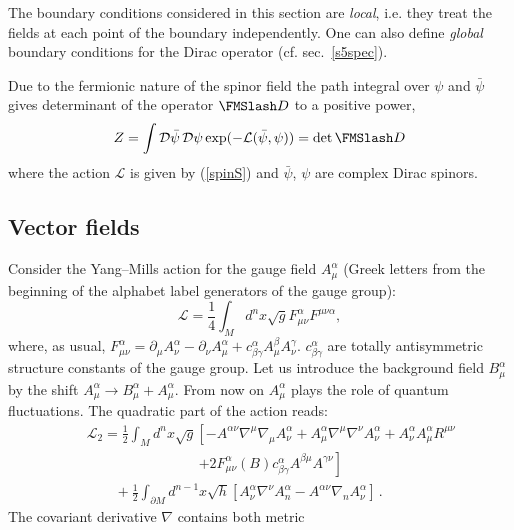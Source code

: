 The boundary conditions considered in this section are {\it local},
i.e. they treat the fields at each point of the boundary independently.
One can also define {\it global} boundary conditions for the
Dirac operator (cf. sec.\ \ref{s5spec}).

Due to the fermionic nature of the spinor field the path
integral over $\psi$ and $\bar \psi$ gives determinant
of the operator $\Dir$ to a positive power,
\begin{equation}
Z=\int \mathcal{D}\bar\psi\,\mathcal{D}\psi 
\exp (-\mathcal{L}(\bar \psi ,\psi ))=\det \Dir
\label{pathspin}
\end{equation}
where the action $\mathcal{L}$ is given by (\ref{spinS}) and
$\bar\psi$, $\psi$ are complex Dirac spinors.


\subsection{Vector fields}\label{s3vect}
Consider the Yang--Mills action for the gauge field 
$A_\mu^\alpha$ (Greek letters from the beginning of the alphabet label
generators of the gauge group):
\begin{equation}
\mathcal{L}=\frac 14 \int_M d^nx \sqrt{g} F_{\mu\nu}^\alpha
F^{\mu\nu\alpha} ,\label{YMaction}
\end{equation}
where, as usual, $F_{\mu\nu}^\alpha =
\partial_\mu A_\nu^\alpha -\partial_\nu A_\mu^\alpha
+c^\alpha_{\beta\gamma}A_\mu^\beta A_\nu^\gamma$.
$c^\alpha_{\beta\gamma}$ are totally antisymmetric
structure constants of the
gauge group. Let us introduce the background field $B_\mu^\alpha$
by the shift $A_\mu^\alpha \to B_\mu^\alpha + A_\mu^\alpha$.
From now on $A_\mu^\alpha$ plays the role of quantum
fluctuations. The quadratic part of the action reads:
\begin{eqnarray}
&&\mathcal{L}_2=\frac 12 \int_M d^nx \sqrt{g} \left[ -A^{\alpha\nu}
\nabla^\mu\nabla_\mu A_\nu^\alpha 
+ A_\mu^\alpha \nabla^\mu\nabla^\nu A_\nu^\alpha  +
A_\nu^\alpha A_\mu^\alpha R^{\mu\nu}\right. \nonumber\\
&&\qquad\qquad\qquad\qquad
\left.+2F_{\mu\nu}^\alpha (B) c^\alpha_{\beta\gamma}A^{\beta\mu}
A^{\gamma\nu} \right]
\nonumber \\
&&\qquad +\frac 12 \int_{\partial M}d^{n-1}x \sqrt{h} \left[
A_\nu^\alpha \nabla^\nu A_n^\alpha -
A^{\alpha\nu}\nabla_n A_\nu^\alpha \right] \,.
\label{S2vector}
\end{eqnarray}
The covariant derivative $\nabla$ contains both metric
